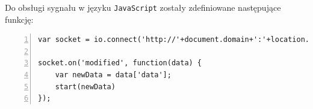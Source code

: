 \documentclass[a4paper]{article}
\begin{document}
    Do obsługi sygnału w języku \texttt{JavaScript} zostały zdefiniowane następujące funkcję:
\begin{lstlisting}[frame=single, numbers=left, basicstyle=\ttfamily\small,
    caption={Połączenie gniazdek w przeglądrce z serwerem i odebranie danych}]
var socket = io.connect('http://'+document.domain+':'+location.port);

socket.on('modified', function(data) {
    var newData = data['data'];
    start(newData)
});

\end{lstlisting}





\end{document}
